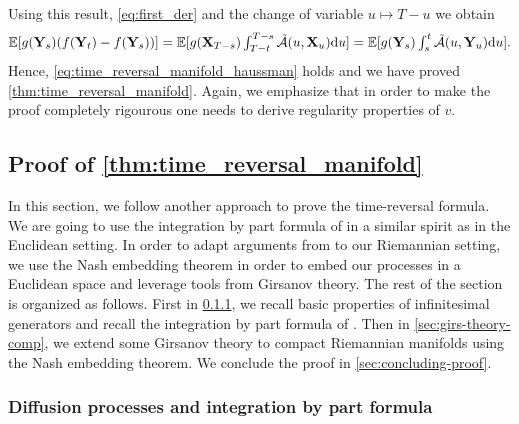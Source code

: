   Using this result, \eqref{eq:first_der} and the change of variable $u \mapsto T-u$ we obtain 
  \begin{equation}
    \mathbb{E} [ g(\mathbf{Y}_s)(f(\mathbf{Y}_t) - f(\mathbf{Y}_s)) ] = \textstyle{\mathbb{E}[ g(\mathbf{X}_{T-s})\int_{T-t}^{T-s} \tilde{\mathcal{A}}(u, \mathbf{X}_u) \mathrm{d}u  ] } = \textstyle{\mathbb{E}[ g(\mathbf{Y}_{s})\int_{s}^{t} \tilde{\mathcal{A}}(u, \mathbf{Y}_u) \mathrm{d}u  ] }  .
  \end{equation}
  Hence, \eqref{eq:time_reversal_manifold_haussman} holds and we have proved
  \cref{thm:time_reversal_manifold}. Again, we emphasize that in order to make
  the proof completely rigourous one needs to derive regularity properties of $v$.

  
\subsection{Proof of \cref{thm:time_reversal_manifold}}
\label{sec:proof-crefthm:t}

In this section, we follow another approach to prove the time-reversal
formula. We are going to use the integration by part formula of \citet[Theorem
3.17]{cattiaux2021time} in a similar spirit as \citet[Theorem
4.9]{cattiaux2021time} in the Euclidean setting. In order to adapt arguments
from \citet{cattiaux2021time} to our Riemannian setting, we use the Nash
embedding theorem in order to embed our processes in a Euclidean space and
leverage tools from Girsanov theory. The rest of the section is organized as
follows. First in \cref{sec:diff-proc-stoch}, we recall basic properties of
infinitesimal generators and recall the integration by part formula of
\citet[Theorem 3.17]{cattiaux2021time}. Then in \cref{sec:girs-theory-comp}, we
extend some Girsanov theory to compact Riemannian manifolds using the Nash
embedding theorem. We conclude the proof in \cref{sec:concluding-proof}.

\subsubsection{Diffusion processes and integration by part formula}
\label{sec:diff-proc-stoch}

